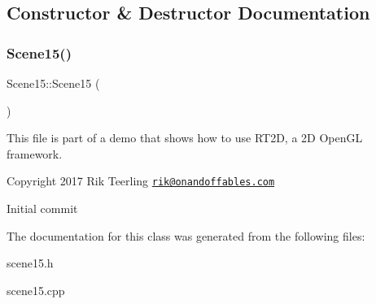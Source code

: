 \subsection{Constructor \& Destructor Documentation}
\mbox{\label{class_scene15_aadba8e1ea9c1ab830e52be6d56cb5fea}} 
\subsubsection{\texorpdfstring{Scene15()}{Scene15()}}
{\footnotesize\ttfamily Scene15\+::\+Scene15 (\begin{DoxyParamCaption}{ }\end{DoxyParamCaption})}

This file is part of a demo that shows how to use R\+T2D, a 2D Open\+GL framework.


\begin{DoxyItemize}
\item Copyright 2017 Rik Teerling \href{mailto:rik@onandoffables.com}{\tt rik@onandoffables.\+com}
\begin{DoxyItemize}
\item Initial commit 
\end{DoxyItemize}
\end{DoxyItemize}

The documentation for this class was generated from the following files\+:\begin{DoxyCompactItemize}
\item 
scene15.\+h\item 
scene15.\+cpp\end{DoxyCompactItemize}
